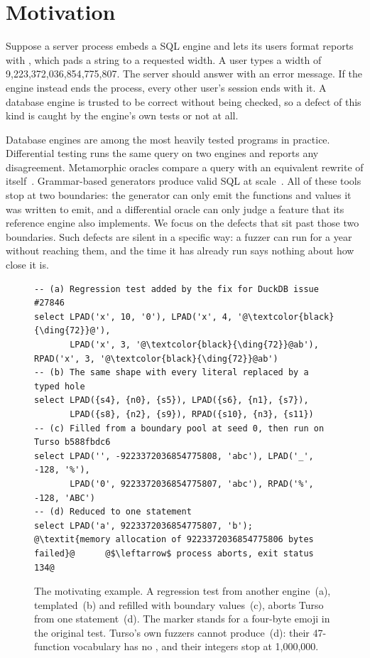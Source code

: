 \section{Motivation}
\label{sec:motivation}
\label{sec:intro}

Suppose a server process embeds a SQL engine and lets its users format reports
with , which pads a string to a requested width. A user types a width
of 9{,}223{,}372{,}036{,}854{,}775{,}807. The server should answer with an error
message. If the engine instead ends the process, every other user's session ends
with it. A database engine is trusted to be correct without being checked, so a
defect of this kind is caught by the engine's own tests or not at all.

Database engines are among the most heavily tested programs in practice.
Differential testing runs the same query on two engines and reports any
disagreement. Metamorphic oracles compare a query with an equivalent rewrite of
itself~\cite{rigger2020tlp,rigger2020norec}. Grammar-based generators produce
valid SQL at scale~\cite{zhong2020squirrel,liang2026sqlbull}. All of these tools
stop at two boundaries: the generator can only emit the functions and values it
was written to emit, and a differential oracle can only judge a feature that its
reference engine also implements. We focus on the defects that sit past those
two boundaries. Such defects are silent in a specific way: a fuzzer can run for
a year without reaching them, and the time it has already run says nothing about
how close it is.

\begin{figure}[t]
\begin{lstlisting}[escapechar=@]
-- (a) Regression test added by the fix for DuckDB issue #27846
select LPAD('x', 10, '0'), LPAD('x', 4, '@\textcolor{black}{\ding{72}}@'),
       LPAD('x', 3, '@\textcolor{black}{\ding{72}}@ab'), RPAD('x', 3, '@\textcolor{black}{\ding{72}}@ab')
-- (b) The same shape with every literal replaced by a typed hole
select LPAD({s4}, {n0}, {s5}), LPAD({s6}, {n1}, {s7}),
       LPAD({s8}, {n2}, {s9}), RPAD({s10}, {n3}, {s11})
-- (c) Filled from a boundary pool at seed 0, then run on Turso b588fbdc6
select LPAD('', -9223372036854775808, 'abc'), LPAD('_', -128, '%'),
       LPAD('0', 9223372036854775807, 'abc'), RPAD('%', -128, 'ABC')
-- (d) Reduced to one statement
select LPAD('a', 9223372036854775807, 'b');
@\textit{memory allocation of 9223372036854775806 bytes failed}@      @$\leftarrow$ process aborts, exit status 134@
\end{lstlisting}
\caption{The motivating example. A regression test from another engine~(a),
templated~(b) and refilled with boundary values~(c), aborts Turso from one
statement~(d). The marker  stands for a four-byte emoji in the original
test. Turso's own fuzzers cannot produce~(d): their 47-function vocabulary has
no , and their integers stop at 1{,}000{,}000.}
\label{fig:motivating}
\end{figure}


